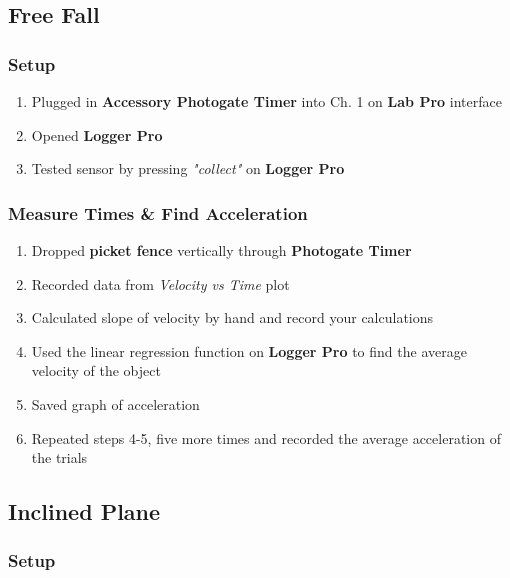 \documentclass[a4paper,12pt]{article}
\begin{document}
\subsection{Free Fall}

\subsubsection{Setup}

	\begin{enumerate}

		\item Plugged in \textbf{Accessory Photogate Timer} into Ch. 1 on \textbf{Lab Pro} interface
		\item Opened \textbf{Logger Pro}
			
		\item Tested sensor by pressing \textit{"collect"} on \textbf{Logger Pro}
	\end{enumerate}	

\subsubsection{Measure Times \& Find Acceleration}
	\begin{enumerate}[resume]

		\item Dropped \textbf{picket fence} vertically through \textbf{Photogate Timer}
	
		\item Recorded data from \textit{Velocity vs Time} plot

		\item Calculated slope of velocity by hand and record your calculations

		\item Used the linear regression function on \textbf{Logger Pro} to find the average velocity of the object

		\item Saved graph of acceleration

		\item Repeated steps 4-5, five more times and recorded the average acceleration of the trials
	\end{enumerate}

\subsection{Inclined Plane}

\subsubsection{Setup}
\end{document}
